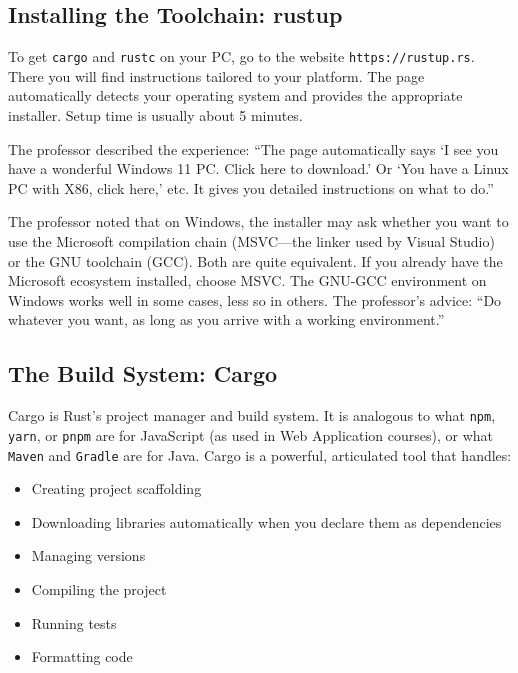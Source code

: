 \subsection{Installing the Toolchain: rustup}

To get \texttt{cargo} and \texttt{rustc} on your PC, go to the website \texttt{https://rustup.rs}. There you will find instructions tailored to your platform. The page automatically detects your operating system and provides the appropriate installer. Setup time is usually about 5 minutes.

The professor described the experience: ``The page automatically says `I see you have a wonderful Windows 11 PC. Click here to download.' Or `You have a Linux PC with X86, click here,' etc. It gives you detailed instructions on what to do.''

\begin{insightbox}
The professor noted that on Windows, the installer may ask whether you want to use the Microsoft compilation chain (MSVC---the linker used by Visual Studio) or the GNU toolchain (GCC). Both are quite equivalent. If you already have the Microsoft ecosystem installed, choose MSVC. The GNU-GCC environment on Windows works well in some cases, less so in others. The professor's advice: ``Do whatever you want, as long as you arrive with a working environment.''
\end{insightbox}

\subsection{The Build System: Cargo}

Cargo is Rust's project manager and build system. It is analogous to what \texttt{npm}, \texttt{yarn}, or \texttt{pnpm} are for JavaScript (as used in Web Application courses), or what \texttt{Maven} and \texttt{Gradle} are for Java. Cargo is a powerful, articulated tool that handles:

\begin{itemize}
    \item Creating project scaffolding
    \item Downloading libraries automatically when you declare them as dependencies
    \item Managing versions
    \item Compiling the project
    \item Running tests
    \item Formatting code
\end{itemize}

